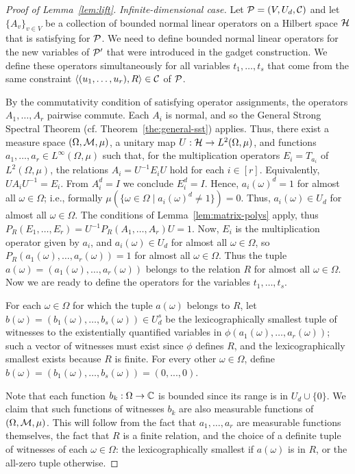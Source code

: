 \begin{proof}[Proof of Lemma~\ref{lem:lift}]
\smallskip

{\it Infinite-dimensional case.}
Let ${\mathcal P}=(V,U_d,{\mathcal C})$ and let $\{A_v\}_{v\in V}$ be a collection of bounded
  normal linear operators on a Hilbert space ${\mathcal H}$ that is satisfying for ${\mathcal P}$. We need to define bounded
normal linear operators for the new variables of ${\mathcal P}'$ that were introduced in
  the gadget construction. We define these operators
simultaneously for all variables $t_1,\dots,t_s$ that come from the same constraint $\langle (u_1,\ldots,u_r),R \rangle\in{\mathcal C}$ of ${\mathcal P}$.

By the commutativity condition of satisfying operator assignments, the operators
  $A_1,\dots,A_r$ pairwise commute. Each $A_i$ is normal, and so the General Strong Spectral Theorem (cf. Theorem~\ref{the:general-sst}) applies.
Thus, there exist a measure space $(\Omega,{\mathcal M},\mu)$, a unitary map $U:{\mathcal H}\to L^2(\Omega,\mu)$, and functions $a_1,\dots,a_r\in L^\infty(\Omega,\mu)$ such
that, for the multiplication operators $E_i = T_{a_i}$ of $L^2(\Omega,\mu)$, the relations $A_i = U^{-1} E_iU$ hold for each $i\in [r]$. Equivalently,
$U A_iU^{-1} = E_i$. From $A_i^d=I$ we conclude $E_i^d=I$. Hence, $a_i(\omega)^d = 1$ for almost all $\omega\in\Omega$; i.e., formally $\mu(\{\omega\in\Omega\mid a_i(\omega)^d\ne1\}) = 0$. Thus, $a_i(\omega)\in U_d$ for almost all $\omega\in\Omega$. The conditions of Lemma~\ref{lem:matrix-polys} apply, thus $P_R(E_1,\dots, E_r)=U^{-1}P_R (A_1,\dots, A_r)U=1$. Now, $E_i$ is the multiplication operator given by $a_i$, and $a_i(\omega)\in U_d$ for almost all $\omega\in\Omega$, so $P_R (a_1(\omega),\dots,a_r(\omega)) = 1$ for almost all $\omega\in\Omega$. Thus the tuple $a(\omega) = (a_1(\omega),\dots,a_r(\omega))$ belongs to the relation
$R$ for almost all $\omega\in\Omega$. Now we are ready to define the operators for the variables $t_1,\dots,t_s$.

For each $\omega\in\Omega$ for which the tuple $a(\omega)$ belongs to $R$, let $b(\omega) = (b_1(\omega),\dots, b_s(\omega))\in U_d^s$ be the lexicographically
smallest tuple of witnesses to the existentially quantified variables in $\phi(a_1(\omega),\dots, a_r(\omega))$; such a vector of witnesses
must exist since $\phi$ defines $R$, and the lexicographically smallest exists because $R$ is finite. For every other $\omega\in\Omega$, define
$b(\omega) = (b_1(\omega),\dots, b_s(\omega)) = (0,..., 0)$.

Note that each function $b_k:\Omega\to{\mathbb C}$ is bounded since its range is in $U_d\cup\{0\}$. We claim that such functions of witnesses
$b_k$ are also measurable functions of $(\Omega,{\mathcal M},\mu)$. This will follow from the fact that $a_1,\dots,a_r$ are measurable functions themselves, the fact that $R$ is a finite relation, and the choice of a definite tuple of witnesses of each $\omega\in\Omega$: the lexicographically
smallest if $a(\omega)$ is in $R$, or the all-zero tuple otherwise. 


\end{proof}
